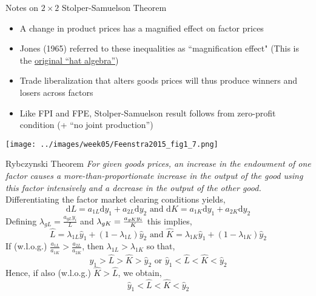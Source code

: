 \documentclass[11pt,notes=hide,aspectratio=169]{beamer}
\begin{document}
\begin{frame}{Notes on $2 \times 2$ Stolper-Samuelson Theorem}
\begin{itemize}
\item A change in product prices has a magnified effect on factor
prices
\item Jones (1965) referred to these inequalities as ``magnification
effect"
(This is the \href{https://tradediversion.net/2018/05/07/on-hat-algebra/}{original ``hat algebra''})
\item Trade liberalization that alters goods prices will thus produce winners and losers across factors
\item Like FPI and FPE, Stolper-Samuelson result follows from zero-profit condition (+ ``no joint production'')
\end{itemize}
\begin{center}
\texttt{[image: ../images/week05/Feenstra2015\_fig1\_7.png]}
\end{center}
\end{frame}
\begin{frame}{Rybczynski Theorem}
\textit{For given goods prices, an increase in the endowment of one factor
causes a more-than-proportionate increase in the output of the good using this factor intensively and
a decrease in the output of the other good.}
Differentiating the factor market clearing conditions yields,%
\begin{equation*}
\textrm{d}L=a_{1L}\textrm{d}y_{1}+a_{2L}\textrm{d}y_{2}\text{ and\ }\textrm{d}K=a_{1K}\textrm{d}y_{1}+a_{2K}\textrm{d}y_{2}
\end{equation*}
Defining $\lambda_{gL}=\frac{a_{gL}y_{i}}{L}$ and $\lambda_{gK}=\frac{%
a_{gK}y_{i}}{K}$ this implies,%
\begin{equation*}
\hat{L}=\lambda_{1L}\hat{y}_{1}+\left( 1-\lambda_{1L}\right) \hat{y}_{2}%
\text{ and }\hat{K}=\lambda_{1K}\hat{y}_{1}+\left( 1-\lambda_{1K}\right) 
\hat{y}_{2}
\end{equation*}
If (w.l.o.g.) $\frac{a_{1L}}{a_{1K}}>\frac{a_{2L}}{a_{2K}}$, then $\lambda
_{1L}>\lambda_{1K}$ so that,%
\begin{equation*}
\hat{y}_{1}>\hat{L}>\hat{K}>\hat{y}_{2}\text{ or }\hat{y}_{1}<\hat{L}<\hat{K}%
<\hat{y}_{2}
\end{equation*}
Hence, if also (w.l.o.g.) $\hat{K}>\hat{L}$, we obtain,%
\begin{equation*}
\hat{y}_{1}<\hat{L}<\hat{K}<\hat{y}_{2}
\end{equation*}
\end{frame}
\end{document}
